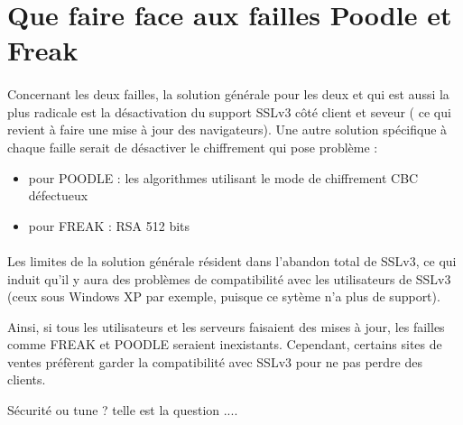 \section{Que faire face aux failles Poodle et Freak}

\paragraph{}
Concernant les deux failles, la solution générale pour les deux et qui est aussi la plus radicale est la désactivation du support SSLv3 c\^oté client et seveur ( ce qui revient à faire une mise à jour des navigateurs). Une autre solution spécifique à chaque faille serait de désactiver le chiffrement qui pose problème :
\begin{itemize}
\item pour POODLE : les algorithmes utilisant le mode de chiffrement CBC défectueux
\item pour FREAK : RSA 512 bits
\end {itemize}

\paragraph{}
Les limites de la solution générale résident dans l'abandon total de SSLv3, ce qui induit qu'il y aura des problèmes de compatibilité avec les utilisateurs de SSLv3 (ceux sous Windows XP par exemple, puisque ce sytème n'a plus de support).

Ainsi, si tous les utilisateurs et les serveurs faisaient des mises à jour, les failles comme FREAK et POODLE seraient inexistants. Cependant, certains sites de ventes préfèrent garder la compatibilité avec SSLv3 pour ne pas perdre des clients.


Sécurité ou tune ? telle est la question .... 




 